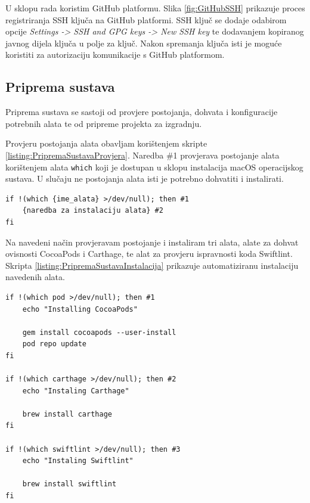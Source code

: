 \documentclass[times, utf8, diplomski, numeric]{fer}
\begin{document}
U sklopu rada koristim GitHub platformu. Slika \ref{fig:GitHubSSH} prikazuje proces registriranja SSH ključa na GitHub platformi. SSH ključ se dodaje odabirom opcije \textit{Settings -> SSH and GPG keys -> New SSH key} te dodavanjem kopiranog javnog dijela ključa u polje za ključ. Nakon spremanja ključa isti je moguće koristiti za autorizaciju komunikacije s GitHub platformom.


\subsection{Priprema sustava} \label{header:PripremaSustava}

Priprema sustava se sastoji od provjere postojanja, dohvata i konfiguracije potrebnih alata te od pripreme projekta za izgradnju.

Provjeru postojanja alata obavljam korištenjem skripte \ref{listing:PripremaSustavaProvjera}. Naredba \#1 provjerava postojanje alata korištenjem alata \verb|which| koji je dostupan u sklopu instalacija macOS operacijskog sustava. U slučaju ne postojanja alata isti je potrebno dohvatiti i instalirati.

\begin{lstlisting}[caption=Provjera postojanja alata, label=listing:PripremaSustavaProvjera]
if !(which {ime_alata} >/dev/null); then #1
    {naredba za instalaciju alata} #2
fi
\end{lstlisting}

Na navedeni način provjeravam postojanje i instaliram tri alata, alate za dohvat ovisnosti CocoaPods i Carthage, te alat za provjeru ispravnosti koda Swiftlint. Skripta \ref{listing:PripremaSustavaInstalacija} prikazuje automatiziranu instalaciju navedenih alata.


\begin{lstlisting}[caption=Automatizirana instalacija alata, label=listing:PripremaSustavaInstalacija]
if !(which pod >/dev/null); then #1
    echo "Installing CocoaPods"

    gem install cocoapods --user-install
    pod repo update
fi

if !(which carthage >/dev/null); then #2
    echo "Instaling Carthage"

    brew install carthage
fi

if !(which swiftlint >/dev/null); then #3
    echo "Instaling Swiftlint"

    brew install swiftlint
fi
\end{lstlisting}
\end{document}

